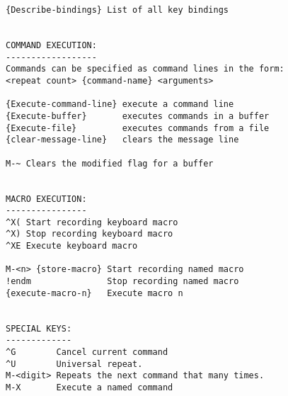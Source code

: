 \begin{verbatim}
{Describe-bindings} List of all key bindings


COMMAND EXECUTION:
------------------
Commands can be specified as command lines in the form:
<repeat count> {command-name} <arguments>

{Execute-command-line} execute a command line
{Execute-buffer}       executes commands in a buffer
{Execute-file}         executes commands from a file
{clear-message-line}   clears the message line

M-~ Clears the modified flag for a buffer


MACRO EXECUTION:
----------------
^X( Start recording keyboard macro
^X) Stop recording keyboard macro
^XE Execute keyboard macro

M-<n> {store-macro} Start recording named macro
!endm               Stop recording named macro
{execute-macro-n}   Execute macro n 


SPECIAL KEYS:
-------------
^G        Cancel current command
^U        Universal repeat.
M-<digit> Repeats the next command that many times.
M-X       Execute a named command
\end{verbatim}

